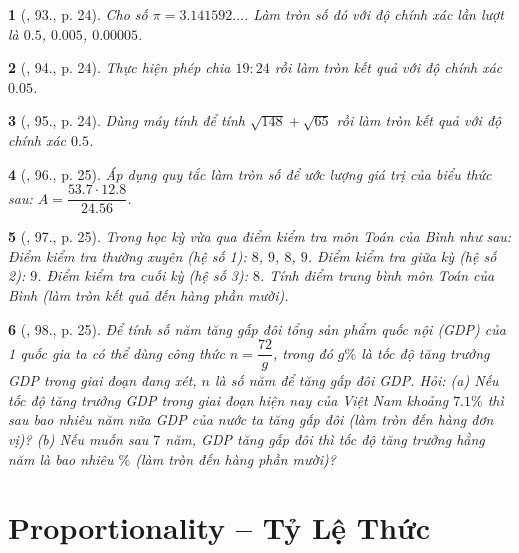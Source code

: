 \documentclass{article}
\newtheorem{baitoan}{}
\begin{document}
\begin{baitoan}[\cite{Tuyen_Toan_7}, 93., p. 24]
	Cho số $\pi = 3.141592\ldots$. Làm tròn số đó với độ chính xác lần lượt là $0.5$, $0.005$, $0.00005$.
\end{baitoan}

\begin{baitoan}[\cite{Tuyen_Toan_7}, 94., p. 24]
	Thực hiện phép chia $19:24$ rồi làm tròn kết quả với độ chính xác $0.05$.
\end{baitoan}

\begin{baitoan}[\cite{Tuyen_Toan_7}, 95., p. 24]
	Dùng máy  tính để tính $\sqrt{148} + \sqrt{65}$ rồi làm tròn kết quả với độ chính xác $0.5$.
\end{baitoan}

\begin{baitoan}[\cite{Tuyen_Toan_7}, 96., p. 25]
	Áp dụng quy tắc làm tròn số để ước lượng giá trị của biểu thức sau: $A = \dfrac{53.7\cdot 12.8}{24.56}$.
\end{baitoan}

\begin{baitoan}[\cite{Tuyen_Toan_7}, 97., p. 25]
	Trong học kỳ vừa qua điểm kiểm tra môn Toán của Bình như sau: Điểm kiểm tra thường xuyên (hệ số 1): $8$, $9$, $8$, $9$. Điểm kiểm tra giữa kỳ (hệ số 2): $9$. Điểm kiểm tra cuối kỳ (hệ số 3): $8$. Tính điểm trung bình môn Toán của Bình (làm tròn kết quả đến hàng phần mười).
\end{baitoan}

\begin{baitoan}[\cite{Tuyen_Toan_7}, 98., p. 25]
	Để tính số năm tăng gấp đôi tổng sản phẩm quốc nội (GDP) của 1 quốc gia ta có thể dùng công thức $n = \dfrac{72}{g}$, trong đó $g\%$ là {\rm tốc độ tăng trưởng GDP} trong giai đoạn đang xét, $n$ là số năm để tăng gấp đôi GDP. Hỏi: (a) Nếu tốc độ tăng trưởng GDP trong giai đoạn hiện nay của Việt Nam khoảng $7.1\%$ thì sau bao nhiêu năm nữa GDP của nước ta tăng gấp đôi (làm tròn đến hàng đơn vị)? (b) Nếu muốn sau $7$ năm, GDP tăng gấp đôi thì tốc độ tăng trưởng hằng năm là bao nhiêu $\%$ (làm tròn đến hàng phần mười)?
\end{baitoan}


\section{Proportionality -- Tỷ Lệ Thức}
\end{document}
